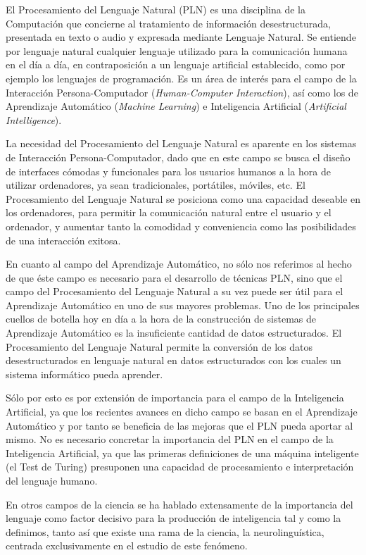 El Procesamiento del Lenguaje Natural (PLN) es una disciplina de la Computación que concierne al tratamiento de información desestructurada, presentada en texto o audio y expresada mediante Lenguaje Natural.
%
Se entiende por lenguaje natural cualquier lenguaje utilizado para la comunicación humana en el día a día, en contraposición a un lenguaje artificial establecido, como por ejemplo los lenguajes de programación.
%
Es un área de interés para el campo de la Interacción Persona-Computador (\textit{Human-Computer Interaction}), así como los de Aprendizaje Automático (\textit{Machine Learning}) e Inteligencia Artificial (\textit{Artificial Intelligence}).

La necesidad del Procesamiento del Lenguaje Natural es aparente en los sistemas de Interacción Persona-Computador, dado que en este campo se busca el diseño de interfaces cómodas y funcionales para los usuarios humanos a la hora de utilizar ordenadores, ya sean tradicionales, portátiles, móviles, etc.
%
El Procesamiento del Lenguaje Natural se posiciona como una capacidad deseable en los ordenadores, para permitir la comunicación natural entre el usuario y el ordenador, y aumentar tanto la comodidad y conveniencia como las posibilidades de una interacción exitosa.

En cuanto al campo del Aprendizaje Automático, no sólo nos referimos al hecho de que éste campo es necesario para el desarrollo de técnicas PLN, sino que el campo del Procesamiento del Lenguaje Natural a su vez puede ser útil para el Aprendizaje Automático en uno de sus mayores problemas.
%
Uno de los principales cuellos de botella hoy en día a la hora de la construcción de sistemas de Aprendizaje Automático es la insuficiente cantidad de datos estructurados. El Procesamiento del Lenguaje Natural permite la conversión de los datos desestructurados en lenguaje natural en datos estructurados con los cuales un sistema informático pueda aprender.

Sólo por esto es por extensión de importancia para el campo de la Inteligencia Artificial, ya que los recientes avances en dicho campo se basan en el Aprendizaje Automático y por tanto se beneficia de las mejoras que el PLN pueda aportar al mismo.
%
No es necesario concretar la importancia del PLN en el campo de la Inteligencia Artificial, ya que las primeras definiciones de una máquina inteligente (el Test de Turing) presuponen una capacidad de procesamiento e interpretación del lenguaje humano.

En otros campos de la ciencia se ha hablado extensamente de la importancia del lenguaje como factor decisivo para la producción de inteligencia tal y como la definimos, tanto así que existe una rama de la ciencia, la neurolinguística, centrada exclusivamente en el estudio de este fenómeno.